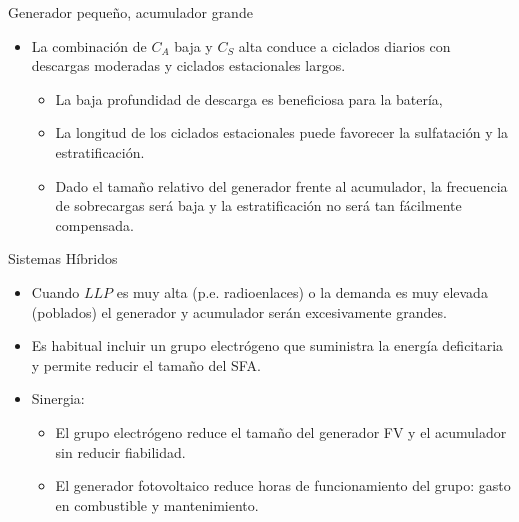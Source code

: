 \documentclass[xcolor={usenames,svgnames,dvipsnames}]{beamer}
\begin{document}
\begin{frame}[label={sec:orgf37cd9c}]{Generador pequeño, acumulador grande}
\begin{itemize}
\item La \alert{combinación de \(C_{A}\) baja y \(C_{S}\) alta} conduce a ciclados
diarios con descargas moderadas y ciclados estacionales largos.

\begin{itemize}
\item La baja profundidad de descarga es beneficiosa para la batería,

\item La longitud de los ciclados estacionales puede favorecer la
sulfatación y la estratificación.

\item Dado el tamaño relativo del generador frente al acumulador, la
frecuencia de sobrecargas será baja y la estratificación no será
tan fácilmente compensada.
\end{itemize}
\end{itemize}
\end{frame}

\begin{frame}[label={sec:org7b2f46b}]{Sistemas Híbridos}
\begin{itemize}
\item Cuando \(LLP\) es muy alta (p.e. radioenlaces) o la demanda es muy
elevada (poblados) el generador y acumulador serán excesivamente
grandes.

\item Es habitual incluir un grupo electrógeno que suministra la energía
deficitaria y permite reducir el tamaño del SFA.

\item Sinergia:

\begin{itemize}
\item El grupo electrógeno reduce el tamaño del generador FV y el
acumulador sin reducir fiabilidad.

\item El generador fotovoltaico reduce horas de funcionamiento del
grupo: gasto en combustible y mantenimiento.
\end{itemize}
\end{itemize}
\end{frame}
\end{document}
